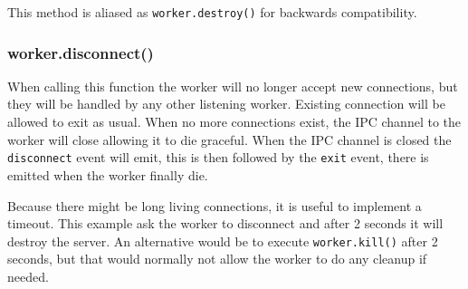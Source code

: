 This method is aliased as \texttt{worker.destroy()} for backwards
compatibility.

\subsubsection{worker.disconnect()}

When calling this function the worker will no longer accept new
connections, but they will be handled by any other listening worker.
Existing connection will be allowed to exit as usual. When no more
connections exist, the IPC channel to the worker will close allowing it
to die graceful. When the IPC channel is closed the \texttt{disconnect}
event will emit, this is then followed by the \texttt{exit} event, there
is emitted when the worker finally die.

Because there might be long living connections, it is useful to
implement a timeout. This example ask the worker to disconnect and after
2 seconds it will destroy the server. An alternative would be to execute
\texttt{worker.kill()} after 2 seconds, but that would normally not
allow the worker to do any cleanup if needed.

